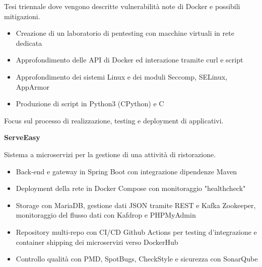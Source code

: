 \documentclass[a4paper]{letter}
\begin{document}
\begin{minipage}[t]{0.65\textwidth}
{\small Tesi triennale dove vengono descritte vulnerabilità note di Docker e possibili mitigazioni. }

\begin{itemize}
    \item Creazione di un laboratorio di pentesting con macchine virtuali in rete dedicata
    \item Approfondimento delle API di Docker ed interazione tramite curl e script
    \item Approfondimento dei sistemi Linux e dei moduli Seccomp, SELinux, AppArmor
    \item Produzione di script in Python3 (CPython) e C
\end{itemize}
\vspace{1 mm}

\vspace{0.15 cm}

\makeatletter
\newcommand{\ProgettiMagistraleBox}{%
}
\makeatother

\ProgettiMagistraleBox

\vspace{0.8 cm}

Focus sul processo di realizzazione, testing e deployment di applicativi.

\vspace{2 mm}
{\large \textbf{ServeEasy}}

{\small Sistema a microservizi per la gestione di una attività di ristorazione. }

\vspace{1 mm}
\begin{itemize}
    \item Back-end e gateway in Spring Boot con integrazione dipendenze Maven
    \item Deployment della rete in Docker Compose con monitoraggio "healthcheck"
    \item Storage con MariaDB, gestione dati JSON tramite REST e Kafka Zookeeper, monitoraggio del flusso dati con Kafdrop e PHPMyAdmin
    \item Repository multi-repo con CI/CD Github Actions per testing d'integrazione e container shipping dei microservizi verso DockerHub
    \item Controllo qualità con PMD, SpotBugs, CheckStyle e sicurezza con SonarQube
\end{itemize}


\end{minipage}
\end{document}
